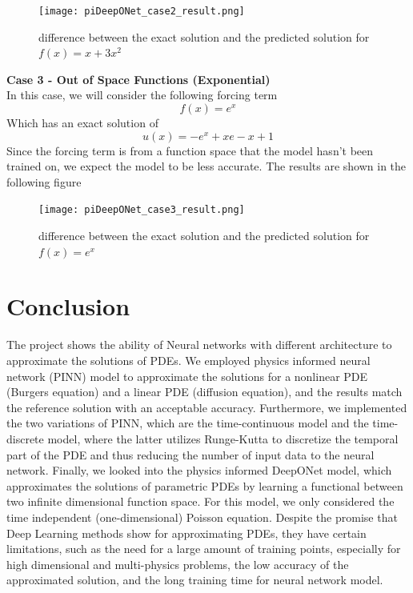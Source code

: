 \documentclass[a4paper,12pt]{article}
\theoremstyle{definition}
\begin{document}
\begin{figure}[H]
    \centering 
    \texttt{[image: piDeepONet\_case2\_result.png]}
    \label{quadratic_f}
    \caption[figure2]{difference between the exact solution and the predicted solution for $f(x) = x + 3x^2$}
\end{figure}


\textbf{Case 3 - Out of Space Functions (Exponential)}\\
In this case, we will consider the following forcing term
\[f(x) = e^x\] 
Which has an exact solution of 
\[u(x) = - e^x +xe -x + 1\]
Since the forcing term is from a function space that the model hasn't been trained on, 
we expect the model to be less accurate. The results are shown in the following figure

\begin{figure}[H]
    \centering 
    \texttt{[image: piDeepONet\_case3\_result.png]}
    \label{exp_f}
    \caption[figure3]{difference between the exact solution and the predicted solution for $f(x) = e^x$}
\end{figure}

\section{Conclusion}
The project shows the ability of Neural networks with different architecture
to approximate the solutions of PDEs. We employed physics informed 
neural network (PINN) model to approximate the solutions for a nonlinear 
PDE (Burgers equation) and a linear PDE (diffusion equation), and the results 
match the reference solution with an acceptable accuracy. Furthermore, we 
implemented the two variations of PINN, which are the time-continuous model and
the time-discrete model, where the latter utilizes Runge-Kutta to discretize the 
temporal part of the PDE and thus reducing the number of input data to the neural network.
Finally, we looked into the physics informed DeepONet model, which approximates the solutions 
of parametric PDEs by learning a functional between two infinite dimensional function space. 
For this model, we only considered the time independent (one-dimensional) Poisson equation.
Despite the promise that Deep Learning methods show for approximating PDEs, they have certain 
limitations, such as the need for a large amount of training points, especially for high dimensional
and multi-physics problems, the low accuracy of the approximated solution, and the long training time for 
neural network model.
\end{document}
